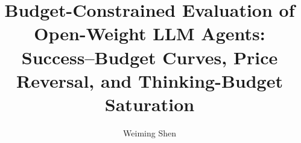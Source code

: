 \documentclass[preprint,authoryear,12pt]{elsarticle}
\begin{document}
\begin{frontmatter}

\title{Budget-Constrained Evaluation of Open-Weight LLM Agents: Success--Budget Curves, Price Reversal, and Thinking-Budget Saturation}

\author[label1]{Weiming Shen}


\end{frontmatter}
\end{document}

